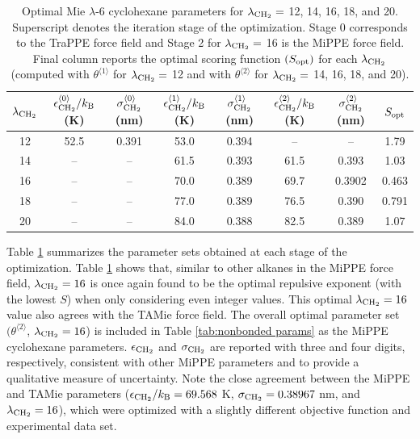 \documentclass[journal=jced,manuscript=article]{achemso}
\begin{document}
    \begin{table}[h!]
		\caption{Optimal Mie $\lambda$-6 cyclohexane parameters for $\lambda_{\rm CH_2} =$ 12, 14, 16, 18, and 20. Superscript denotes the iteration stage of the optimization. Stage 0 corresponds to the TraPPE force field and Stage 2 for $\lambda_{\rm CH_2} =$ 16 is the MiPPE force field. Final column reports the optimal scoring function $(S_{\rm opt})$ for each $\lambda_{\rm CH_2}$ (computed with $\theta^{\langle1\rangle}$ for $\lambda_{\rm CH_2} =$ 12 and with $\theta^{\langle2\rangle}$ for $\lambda_{\rm CH_2} =$ 14, 16, 18, and 20).} \label{tab:lam opt}
		\begin{center}
			\begin{tabular}{|c|c|c|c|c|c|c|c|}
				\hline
				$\lambda_{\rm CH_2}$ & $\epsilon_{\rm CH_2}^{\langle0\rangle}/k_{\rm B}$ (K) & $\sigma_{\rm CH_2}^{\langle0\rangle}$ (nm) & $\epsilon_{\rm CH_2}^{\langle1\rangle}/k_{\rm B}$ (K) & $\sigma_{\rm CH_2}^{\langle1\rangle}$ (nm) & $\epsilon_{\rm CH_2}^{\langle2\rangle}/k_{\rm B}$ (K) & $\sigma_{\rm CH_2}^{\langle2\rangle}$ (nm) & $S_{\rm opt}$ \\ \hline
				12 & 52.5 & 0.391 & 53.0 & 0.394 & -- & -- & 1.79 \\ 
				14 & -- & -- & 61.5 & 0.393 & 61.5 & 0.393 & 1.03 \\ 
				16 & -- & -- & 70.0 & 0.389 & 69.7 & 0.3902 & 0.463 \\
				18 & -- & -- & 77.0 & 0.389 & 76.5 & 0.390 & 0.791 \\
				20 & -- & -- & 84.0 & 0.388 & 82.5 & 0.389 & 1.07 \\
				\hline
			\end{tabular}
		\end{center} 
	\end{table}


Table \ref{tab:lam opt} summarizes the parameter sets obtained at each stage of the optimization. Table \ref{tab:lam opt} shows that, similar to other alkanes in the MiPPE force field, $\lambda_{\rm CH_2} = 16$ is once again found to be the optimal repulsive exponent (with the lowest $S$) when only considering even integer values. This optimal $\lambda_{\rm CH_2} = 16$ value also agrees with the TAMie force field. The overall optimal parameter set $(\theta^{\langle2\rangle}$, $\lambda_{\rm CH_2} = 16$) is included in Table \ref{tab:nonbonded params} as the MiPPE cyclohexane parameters. $\epsilon_{\rm CH_2}$ and $\sigma_{\rm CH_2}$ are reported with three and four digits, respectively, consistent with other MiPPE parameters and to provide a qualitative measure of uncertainty. Note the close agreement between the MiPPE and TAMie parameters \cite{Weidler2016} ($\epsilon_{\rm CH_2}/k_{\rm B} = 69.568$ K, $\sigma_{\rm CH_2} = 0.38967$ nm, and $\lambda_{\rm CH_2} = 16$), which were optimized with a slightly different objective function and experimental data set. 
\end{document}
